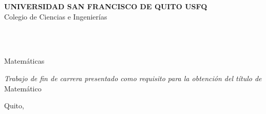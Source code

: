 \begin{titlepage}
    \begin{center}
    {\Large\textbf{UNIVERSIDAD SAN FRANCISCO DE QUITO USFQ}}\\
    {\large Colegio de Ciencias e Ingenierías} %
    
    \vspace*{\fill}
    
    {\Huge
    \textbf{\titulo}}\\
    {\Large
    \subtitulo}
            
    \vspace{2cm}
            
    {\Large\textbf{\nombre}}\\
    {\large Matemáticas} %
            
    \vfill
            
    \textit{Trabajo de fin de carrera presentado como requisito para la obtención del título de}\\
    Matemático %
            
    \vspace{0.8cm}
            
    Quito, \fecha
            
    \end{center}
\end{titlepage}

